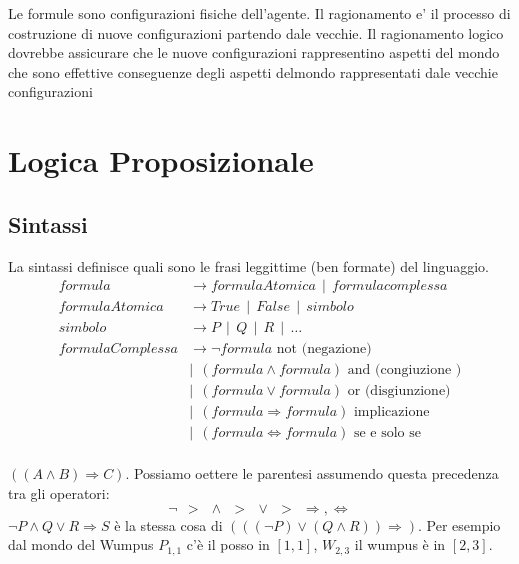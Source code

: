 \hspace{-15pt}Le formule sono configurazioni fisiche dell’agente. 
Il ragionamento e’ il processo di costruzione di nuove configurazioni partendo dale vecchie. 
Il ragionamento logico dovrebbe assicurare che le nuove configurazioni rappresentino aspetti del mondo che sono effettive conseguenze degli aspetti delmondo rappresentati dale vecchie configurazioni
\newpage
\section{Logica Proposizionale}
\subsection{Sintassi}
\begin{definition}[Sintassi]
    La sintassi definisce quali sono le frasi leggittime (ben formate) del linguaggio.
    \begin{equation*}
        \begin{split}
            formula & \longrightarrow formulaAtomica \:\: | \:\: formula complessa \\
            formulaAtomica & \longrightarrow True \:\: | \:\: False \:\: | \:\: simbolo \\
            simbolo & \longrightarrow P \:\: | \:\: Q \:\: | \:\: R \:\:| \:\: \dots\\
            formulaComplessa & \longrightarrow \lnot formula \text{ not (negazione)}\\
            & | \:\: (formula \land formula) \text{ and (congiuzione )}\\
            & | \:\: (formula \lor formula) \text{ or (disgiunzione)}\\
            & | \:\: (formula \Rightarrow formula) \text{ implicazione}\\
            & | \:\: (formula \Leftrightarrow formula) \text{ se e solo se}\\
        \end{split}
    \end{equation*}
\end{definition}

\begin{example}
    $((A \land B) \Rightarrow C)$.
    Possiamo oettere le parentesi assumendo questa precedenza tra gli operatori:
    $$\lnot \:\: > \:\: \land \:\: > \:\: \lor \:\: > \:\: \Rightarrow, \Leftrightarrow$$
    $\lnot P \land Q \lor R \Rightarrow S$ è la stessa cosa di $(((\lnot P) \lor (Q \land R)) \Rightarrow)$. Per esempio
    dal mondo del Wumpus $P_{1,1}$ c'è il posso in $[1,1]$, $W_{2,3}$ il wumpus è in $[2,3]$.
\end{example}


